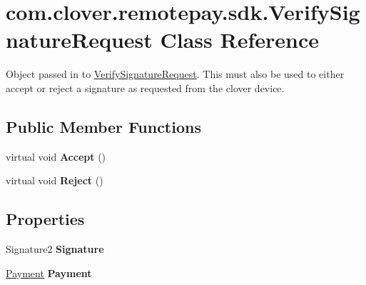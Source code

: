 \hypertarget{classcom_1_1clover_1_1remotepay_1_1sdk_1_1_verify_signature_request}{}\section{com.\+clover.\+remotepay.\+sdk.\+Verify\+Signature\+Request Class Reference}
\label{classcom_1_1clover_1_1remotepay_1_1sdk_1_1_verify_signature_request}


Object passed in to \hyperlink{classcom_1_1clover_1_1remotepay_1_1sdk_1_1_verify_signature_request}{Verify\+Signature\+Request}. This must also be used to either accept or reject a signature as requested from the clover device.  


\subsection*{Public Member Functions}
\begin{DoxyCompactItemize}
\item 
\mbox{\label{classcom_1_1clover_1_1remotepay_1_1sdk_1_1_verify_signature_request_a0a77d7ae0fc42ff221e3dfdbc73b551c}} 
virtual void {\bfseries Accept} ()
\item 
\mbox{\label{classcom_1_1clover_1_1remotepay_1_1sdk_1_1_verify_signature_request_a49a692bf6a7c746a19c6e423410ddc87}} 
virtual void {\bfseries Reject} ()
\end{DoxyCompactItemize}
\subsection*{Properties}
\begin{DoxyCompactItemize}
\item 
\mbox{\label{classcom_1_1clover_1_1remotepay_1_1sdk_1_1_verify_signature_request_a02212d10337e1c0b56f0d06f6018f94d}} 
Signature2 {\bfseries Signature}
\item 
\mbox{\label{classcom_1_1clover_1_1remotepay_1_1sdk_1_1_verify_signature_request_abc156a7a89199f87181787201f3f2da3}} 
\hyperlink{classcom_1_1clover_1_1sdk_1_1v3_1_1payments_1_1_payment}{Payment} {\bfseries Payment}
\end{DoxyCompactItemize}


